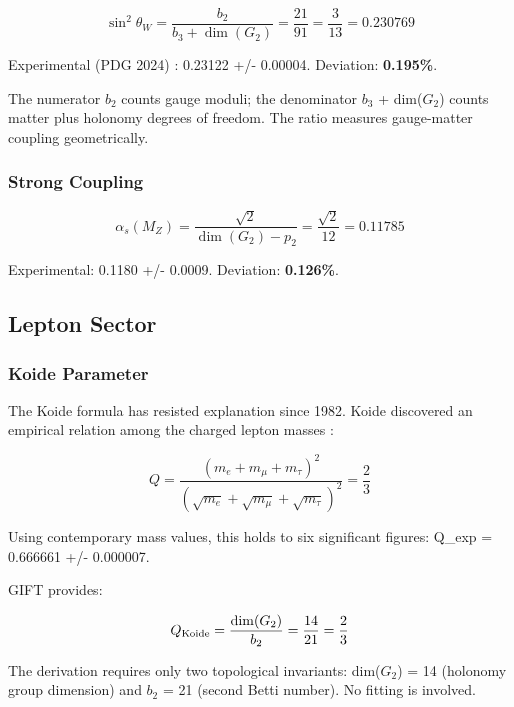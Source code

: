 \documentclass[11pt,a4paper]{article}
\begin{document}
\[\sin^2\theta_W = \frac{b_2}{b_3 + \dim(G_2)} = \frac{21}{91} = \frac{3}{13} = 0.230769\]

Experimental (PDG 2024) \cite{1}: 0.23122 +/- 0.00004. Deviation:
\textbf{0.195\%}.

The numerator \(b_{2}\) counts gauge moduli; the denominator \(b_{3}\) +
dim(\(G_{2}\)) counts matter plus holonomy degrees of freedom. The ratio
measures gauge-matter coupling geometrically.

\subsubsection{Strong Coupling}

\[\alpha_s(M_Z) = \frac{\sqrt{2}}{\dim(G_2) - p_2} = \frac{\sqrt{2}}{12} = 0.11785\]

Experimental: 0.1180 +/- 0.0009. Deviation: \textbf{0.126\%}.

\subsection{Lepton Sector}

\subsubsection{Koide Parameter}

The Koide formula has resisted explanation since 1982. Koide discovered
an empirical relation among the charged lepton masses \cite{6}:

\[Q = \frac{(m_e + m_\mu + m_\tau)^2}{(\sqrt{m_e} + \sqrt{m_\mu} + \sqrt{m_\tau})^2} = \frac{2}{3}\]

Using contemporary mass values, this holds to six significant figures:
Q\_exp = 0.666661 +/- 0.000007.

GIFT provides:

\[Q_{\rm Koide} = \frac{\dim(G_2)}{b_2} = \frac{14}{21} = \frac{2}{3}\]

The derivation requires only two topological invariants: dim(\(G_{2}\))
= 14 (holonomy group dimension) and \(b_{2}\) = 21 (second Betti
number). No fitting is involved.
\end{document}
